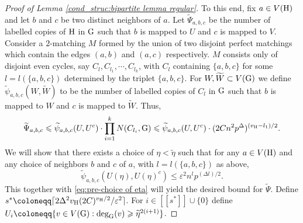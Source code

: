 \documentclass[a4paper,11pt,english,reqno]{amsart}
\numberwithin{equation}{section}
\renewcommand{\leq}{\leqslant}
\renewcommand{\geq}{\geqslant}
\newcommand{\uH}{\textup{H}}
\newcommand{\tu}[1]{\textup{#1}}
\newcommand{\set}[1]{[\![#1]\!]}
\begin{document}
\begin{proof}[Proof of Lemma \ref{cond_struc:bipartite lemma regular}]
To this end, fix $a\in V(\uH)$ and let $b$ and $c$ be two distinct neighbors of $a$. Let $\widetilde\Psi_{a,b,c}$ be the number of labelled copies of $\uH$ in $\tu{G}$ such that $b$ is mapped to $U$ and $c$ is mapped to $V$.  Consider a $2$-matching $M$ formed by the union of two disjoint perfect matchings which contain the edges $(a,b)$ and $(a,c)$ respectively. $M$ consists only of disjoint even cycles, say $C_l, C_{l_1}, \cdots, C_{l_{k}}$, with $C_{l}$ containing $\{a,b,c\}$ for some $l =l(\{a,b,c\})$ determined by the triplet $\{a,b,c\}$. For $W, \widetilde{W}\subset V(\tu{G})$  we define $\widetilde\psi_{a,b,c}(W,\widetilde{W})$ to be the number of labelled copies of $C_{l}$ in $\tu{G}$ such that $b$ is mapped to $W$ and $c$ is mapped to $\widetilde{W}$. Thus,
\begin{equation}\label{eq:pre-choice of eta}
	\widetilde \Psi_{a,b,c} \leq \widetilde\psi_{a,b,c}(U,U^{c}) \cdot   \prod_{i=1}^{k}N(C_{l_{i}}, \tu{G})\leq \widetilde\psi_{a,b,c}(U,U^{c})  \cdot (2C n^{2}p^{\Delta})^{(v_{\uH}-l_{1})/2}.
\end{equation}
We will show that there exists a choice of 
$\eta<\widetilde{\eta}$ such that for any $a \in V(\uH)$ and any choice of neighbors $b$ and $c$ of $a$, with $l=l(\{a,b,c\})$ as above,
\begin{equation}
	\label{choice of eta}
	\widetilde \psi_{a,b,c}(U({\eta}),U({\eta})^{c})\leq \varepsilon^2 n^{l_{}}p^{(\Delta l_{})/2}.
\end{equation} 
This together with \eqref{eq:pre-choice of eta} will yield the desired bound for $\widetilde \Psi$.
Define $s^{*}\coloneqq \lceil 2\Delta^2 v_{\uH} (2C)^{v_{\uH}/2}/\varepsilon^2\rceil $. For $i\in \set{s^{*}} \cup \{0\}$
define $U_{i} \coloneqq \{v\in V(\tu{G}):\tu{deg}_{\tu{G}}(v)\geq \widetilde\eta^{2(i+1)}\}$.  %


\end{proof}
\end{document}
